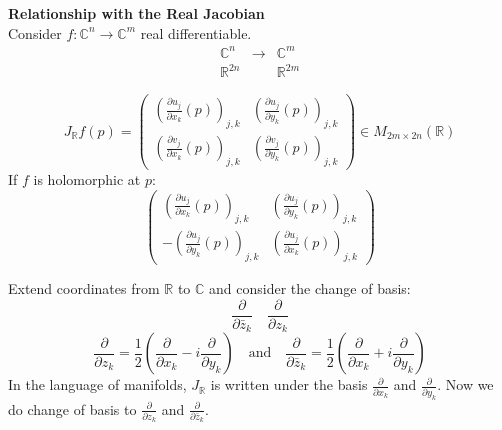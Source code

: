 \documentclass{article}
\begin{document}
\textbf{Relationship with the Real Jacobian}\\
Consider $f: \mathbb{C}^n \to \mathbb{C}^m$ real differentiable.
$$
\begin{array}{ccc}
\mathbb{C}^n & \to & \mathbb{C}^m \\
\mathbb{R}^{2n} & & \mathbb{R}^{2m}
\end{array}
$$

$$
J_{\mathbb{R}} f(p) = \begin{pmatrix}
\left( \frac{\partial u_j}{\partial x_k} (p) \right)_{j, k} & \left( \frac{\partial u_j}{\partial y_k} (p) \right)_{j, k} \\
\left( \frac{\partial v_j}{\partial x_k} (p) \right)_{j, k} & \left( \frac{\partial v_j}{\partial y_k} (p) \right)_{j, k}
\end{pmatrix} \in M_{2m \times 2n} (\mathbb{R})
$$
If $f$ is holomorphic at $p$:
$$
\begin{pmatrix}
\left( \frac{\partial u_j}{\partial x_k} (p) \right)_{j, k} & \left( \frac{\partial u_j}{\partial y_k} (p) \right)_{j, k} \\
- \left( \frac{\partial u_j}{\partial y_k} (p) \right)_{j, k} & \left( \frac{\partial u_j}{\partial x_k} (p) \right)_{j, k}
\end{pmatrix}
$$

Extend coordinates from $\mathbb{R}$ to $\mathbb{C}$ and consider the change of basis:
$$
\frac{\partial}{\partial \bar{z}_k} \quad \frac{\partial}{\partial z_k}
$$
$$
\frac{\partial}{\partial z_k} = \frac{1}{2} \left( \frac{\partial}{\partial x_k} - i \frac{\partial}{\partial y_k} \right) \quad \text{and} \quad \frac{\partial}{\partial \bar{z}_k} = \frac{1}{2} \left( \frac{\partial}{\partial x_k} + i \frac{\partial}{\partial y_k} \right)
$$
In the language of manifolds, $J_{\mathbb{R}}$ is written under the basis $\frac{\partial}{\partial x_k}$ and $\frac{\partial}{\partial y_k}$.
Now we do change of basis to $\frac{\partial}{\partial z_k}$ and $\frac{\partial}{\partial \bar{z}_k}$.
\end{document}
